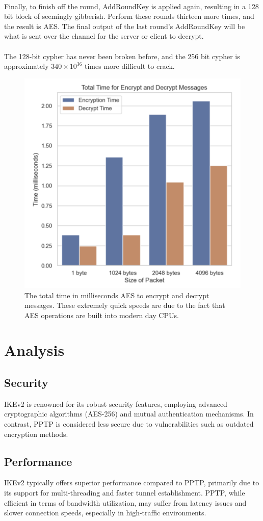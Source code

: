 \documentclass[runningheads]{llncs}
\begin{document}
\\
Finally, to finish off the round, AddRoundKey is applied again, resulting in a 128 bit block of seemingly gibberish. Perform these rounds thirteen more times, and the result is AES. The final output of the last round’s AddRoundKey will be what is sent over the channel for the server or client to decrypt.\\
\\
The 128-bit cypher has never been broken before, and the 256 bit cypher is approximately $340 \times 10^{36}$ times more difficult to crack.
\begin{figure}[h]
    \centering
    \includegraphics[width=0.7\linewidth]{aes_1.png}
    \caption{The total time in milliseconds AES to encrypt and decrypt messages. These extremely quick speeds are due to the fact that AES operations are built into modern day CPUs.}
    \label{fig:Time for Encryption and Decryption using AES}
\end{figure}

\section{Analysis}
\subsection{Security}
IKEv2 is renowned for its robust security features, employing advanced cryptographic algorithms (AES-256) and mutual authentication mechanisms. In contrast, PPTP is considered less secure due to vulnerabilities such as outdated encryption methods.
\subsection{Performance}
IKEv2 typically offers superior performance compared to PPTP, primarily due to its support for multi-threading and faster tunnel establishment. PPTP, while efficient in terms of bandwidth utilization, may suffer from latency issues and slower connection speeds, especially in high-traffic environments.
\end{document}
